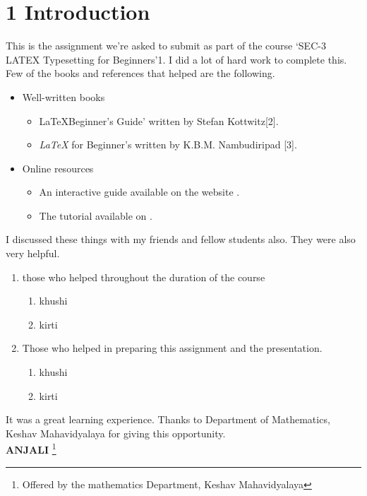 \documentclass[12pt, a4paper]{article}
\begin{document}
\section*{1   Introduction} 
    This is the assignment we’re asked to submit as part of the course ‘SEC-3 LATEX Typesetting for Beginners’1.
I did a lot of hard work to complete this. Few of the books and references that helped are the following.
\begin{itemize}
    \item Well-written books
    \begin{itemize}
        \item \LaTeX Beginner's Guide' written by Stefan Kottwitz[2].
        \item \emph{LaTeX} for Beginner's written by K.B.M. Nambudiripad [3].
    \end{itemize}
    \end{itemize}
 \begin{itemize}
     \item Online resources 
     \begin{itemize}
     \item An interactive guide available on the website
    .   \\          
     \item The tutorial available on 
     .
    \end{itemize}    
   \end{itemize}
 I discussed these things with my friends and fellow students also. They were also very helpful.
\begin{enumerate}
    \item those  who helped throughout the duration of the course
    \begin{enumerate}
        \item khushi
        \item kirti
    \end{enumerate}
        \item  Those who helped in preparing this assignment and the presentation.
        \begin{enumerate}
            \item khushi
            \item kirti
        \end{enumerate}
\end{enumerate} 
 It was a great learning experience. Thanks to Department of Mathematics, Keshav Mahavidyalaya for giving this opportunity. \\
$\boldsymbol{ANJALI} $
\footnote{Offered by the mathematics Department, Keshav Mahavidyalaya}
 \newpage
\end{document}
